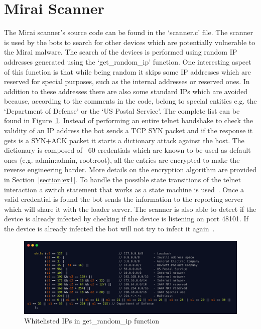 \section{Mirai Scanner}
The Mirai scanner's source code can be found in the `scanner.c' file. The scanner is used by the bots to search for other devices which are potentially vulnerable to the Mirai malware. The search of the devices is performed using random IP addresses generated using the `get\_random\_ip' function. One interesting aspect of this function is that while being random it skips some IP addresses which are reserved for special purposes, such as the internal addresses or reserved ones. In addition to these addresses there are also some standard IPs which are avoided because, according to the comments in the code, belong to special entities e.g. the `Department of Defense' or the `US Postal Service'. The complete list can be found in Figure~\ref{fig:random_ip}. Instead of performing an entire telnet handshake to check the validity of an IP address the bot sends a TCP SYN packet and if the response it gets is a SYN+ACK packet it starts a dictionary attack against the host. The dictionary is composed of ~60 credentials which are known to be used as default ones (e.g. admin:admin, root:root), all the entries are encrypted to make the reverse engineering harder. More details on the encryption algorithm are provided in Section~\ref{section:ex1}. To handle the possible state transitions of the telnet interaction a switch statement that works as a state machine is used~\cite{de2018ddos}. Once a valid credential is found the bot sends the information to the reporting server which will share it with the loader server. The scanner is also able to detect if the device is already infected by checking if the device is listening on port 48101. If the device is already infected the bot will not try to infect it again~\cite{mirai-hackforum}.

\begin{figure}[ht]
    \centering
    \includegraphics[scale=0.12]{resources/images/get_random_ip.png}
    \caption{Whitelisted IPs in get\_random\_ip function}
    \label{fig:random_ip}
\end{figure}

